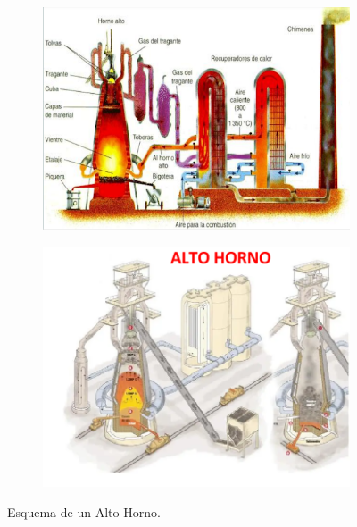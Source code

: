 \documentclass[12pt,a4paper]{article}
\begin{document}
\begin{figure}[h!]
    \centering
    \begin{subfigure}{0.45\textwidth}
        \centering
        \includegraphics[width=\textwidth]{Inagenes para latex/Alto horno.png}
    \end{subfigure}
    \hfill
    \begin{subfigure}{0.45\textwidth}
        \centering
        \includegraphics[width=\textwidth]{Inagenes para latex/alto horno 2.png}
    \end{subfigure}
    \caption{Esquema de un Alto Horno.}
    \label{fig:alto_horno}
\end{figure}
\end{document}
